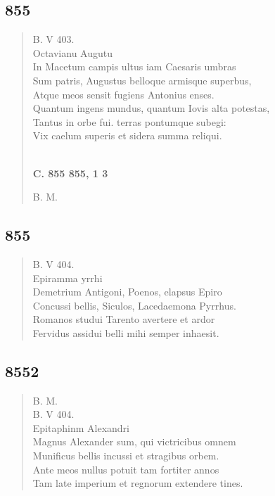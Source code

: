 \documentclass[11pt, a4paper]{report}
\begin{document}
            \subsection*{855}
      \begin{verse}
      B. V 403. \\ Octavianu Augutu \\ In Macetum campis ultus iam Caesaris umbras \\ Sum patris, Augustus belloque armisque superbus, \\ Atque meos sensit fugiens Antonius enses. \\ Quantum ingens mundus, quantum Iovis alta potestas, \\ Tantus in orbe fui. terras pontumque subegi: \\ Vix caelum superis et sidera summa reliqui. \\ 
        ﻿\pagebreak 
     \marginpar{[310]} \begin{center} \textbf{C. 855 855, 1 3} \end{center}B. M. \\ 
      \end{verse}
  
            \subsection*{855}
      \begin{verse}
      B. V 404. \\ Epiramma yrrhi \\ Demetrium Antigoni, Poenos, elapsus Epiro \\ Concussi bellis, Siculos, Lacedaemona Pyrrhus. \\ Romanos studui Tarento avertere et ardor \\ Fervidus assidui belli mihi semper inhaesit. \\ 
      \end{verse}
  
            \subsection*{8552}
      \begin{verse}
      B. M. \\ B. V 404. \\ Epitaphinm Alexandri \\ Magnus Alexander sum, qui victricibus omnem \\ Munificus bellis incussi et stragibus orbem. \\ Ante meos nullus potuit tam fortiter annos \\ Tam late imperium et regnorum extendere tines. \\ 
      \end{verse}
  
\end{document}
